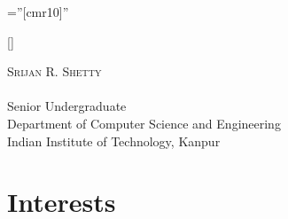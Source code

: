\documentclass[a4paper,10pt]{article} %
\begin{document}
\font\fb=''[cmr10]'' %

\titleformat{\section}{\large\scshape\raggedright}{}{0em}{}[\titlerule] %

\pagestyle{scrheadings} %

\addtolength{\voffset}{-0.5in} %
\addtolength{\textheight}{3cm} %


\renewcommand{\headfont}{\normalfont\rmfamily\scshape} %



{\fontsize{36}{36}\selectfont\scshape Srijan R. Shetty} %
\\ \\
{Senior Undergraduate \\%
Department of Computer Science and Engineering \\%
Indian Institute of Technology, Kanpur}

\section{Interests}
\end{document}

